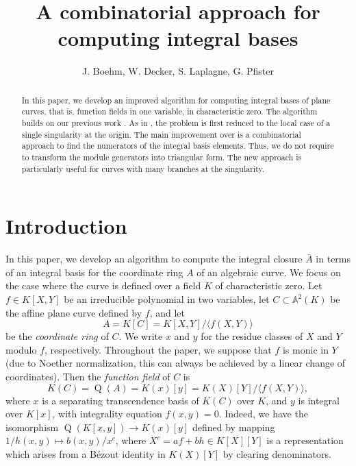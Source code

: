 \documentclass[a4paper,11pt]{amsart}%
\theoremstyle{definition}
\theoremstyle{plain}
\theoremstyle{remark}
\DeclareMathOperator{\TQR}{Q}
\begin{document}
\title[Combinatorial approach for integral bases]{A combinatorial approach for computing integral bases}
\author{J. Boehm, W. Decker, S. Laplagne, G. Pfister}

\begin{abstract}
In this paper, we develop an improved algorithm for computing integral bases of plane curves, that is, function fields in one variable, in characteristic zero. The algorithm builds on our previous work \cite{intbas}.  As in \cite{intbas}, the problem is first reduced to the local case of a single singularity at the origin. The main improvement over \cite{intbas} is a combinatorial approach to find the numerators of the integral basis elements. Thus, we do not require to transform the module generators into triangular form. The new approach is particularly useful for curves with many branches at the singularity.
\end{abstract}
\maketitle

\section{Introduction}
\label{section:introduction}

In this paper, we develop an algorithm to compute the integral closure $\bar A$ in terms of an integral basis for the coordinate ring $A$
of an algebraic curve. We focus on the case where the curve is defined over a field $K$ of characteristic zero.
Let $f\in K[X,Y]$ be an irreducible polynomial in two variables, let $C\subset\mathbb{A}^{2}(K)$ be the affine plane curve
defined by $f$, and let
\[
A=K[C]=K[X,Y]/\langle f(X,Y)\rangle
\]
be the {\emph{coordinate ring}} of $C$. We write $x$ and $y$ for the residue
classes of $X$ and $Y$ modulo $f$, respectively. Throughout the paper, we
suppose that $f$ is monic in $Y$ (due to Noether normalization, this can
always be achieved by a linear change of coordinates). Then the
{\emph{function field}} of $C$ is
\[
K(C)=\TQR(A)=K(x)[y]=K(X)[Y]/\langle f(X,Y)\rangle,
\]
where $x$ is a separating transcendence basis of $K(C)$ over $K$, and $y$ is
integral over $K[x]$, with integrality equation $f(x,y)=0$.
Indeed, we have the isomorphism $\TQR(K[x,y]) \rightarrow  K(x)[y]$ defined by
mapping $1/h(x,y) \mapsto b(x,y) / x^c$, where $X^c = a f + b h\in K[X][Y]$
is a representation which arises from a B\'ezout identity in $K(X)[Y]$ by clearing denominators.
\end{document}
